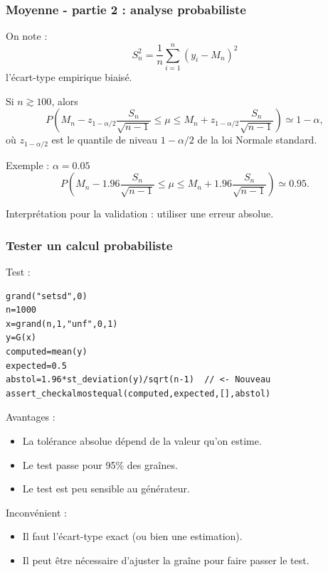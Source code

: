 \documentclass{beamer}
\begin{document}
\begin{frame}[containsverbatim]
\frametitle{Moyenne - partie 2 : analyse probabiliste}

On note :
$$
S_n^2 = \frac{1}{n} \sum_{i=1}^n (y_i-M_n)^2
$$
l'écart-type empirique biaisé.

Si $n\gtrsim 100$, alors 
$$
P\left( M_n - z_{1-\alpha/2} \frac{S_n}{\sqrt{n-1}} \leq \mu 
\leq M_n + z_{1-\alpha/2} \frac{S_n}{\sqrt{n-1}} \right) \simeq 1-\alpha,
$$
où $z_{1-\alpha/2}$ est le quantile de niveau $1-\alpha/2$ de la loi Normale standard.

Exemple : $\alpha=0.05$ 
$$
P\left( M_n - 1.96 \frac{S_n}{\sqrt{n-1}} \leq \mu 
\leq M_n + 1.96 \frac{S_n}{\sqrt{n-1}} \right) \simeq 0.95.
$$

Interprétation pour la validation :
utiliser une erreur absolue.

\end{frame}

\begin{frame}[containsverbatim]
\frametitle{Tester un calcul probabiliste}

Test :
\begin{lstlisting}
grand("setsd",0)
n=1000
x=grand(n,1,"unf",0,1)
y=G(x)
computed=mean(y)
expected=0.5
abstol=1.96*st_deviation(y)/sqrt(n-1)  // <- Nouveau
assert_checkalmostequal(computed,expected,[],abstol)
\end{lstlisting}

Avantages :
\begin{itemize}
\item La tolérance absolue dépend de la valeur qu'on estime. 
\item Le test passe pour 95\% des graînes. 
\item Le test est peu sensible au générateur. 
\end{itemize}

Inconvénient :
\begin{itemize}
\item Il faut l'écart-type exact (ou bien une 
estimation).
\item Il peut être nécessaire d'ajuster la graîne pour 
faire passer le test.
\end{itemize}

\end{frame}
\end{document}
